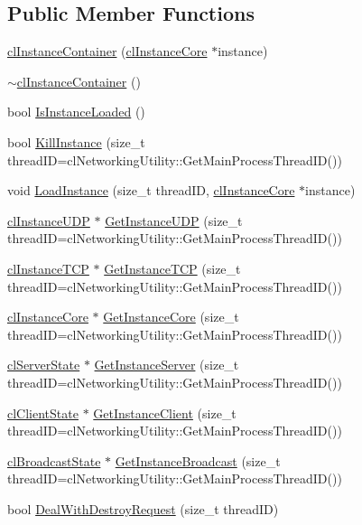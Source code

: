 \subsection*{Public Member Functions}
\begin{DoxyCompactItemize}
\item 
\hyperlink{classcl_instance_container_a49ac9b33bdb75028208c7b4084cbaacd}{clInstanceContainer} (\hyperlink{classcl_instance_core}{clInstanceCore} $\ast$instance)
\item 
\hyperlink{classcl_instance_container_a11553ac24548f650ae0500066cd10fb6}{$\sim$clInstanceContainer} ()
\item 
bool \hyperlink{classcl_instance_container_a34dad02080a638bf441c32c3b1a663b9}{IsInstanceLoaded} ()
\item 
bool \hyperlink{classcl_instance_container_abd6e085c9c842f8a5b19a9f2fec78ebe}{KillInstance} (size\_\-t threadID=clNetworkingUtility::GetMainProcessThreadID())
\item 
void \hyperlink{classcl_instance_container_a5a98fbed42ac21e30f847e35c3184101}{LoadInstance} (size\_\-t threadID, \hyperlink{classcl_instance_core}{clInstanceCore} $\ast$instance)
\item 
\hyperlink{classcl_instance_u_d_p}{clInstanceUDP} $\ast$ \hyperlink{classcl_instance_container_aa07de23793b91688b5cc19a83aa923e6}{GetInstanceUDP} (size\_\-t threadID=clNetworkingUtility::GetMainProcessThreadID())
\item 
\hyperlink{classcl_instance_t_c_p}{clInstanceTCP} $\ast$ \hyperlink{classcl_instance_container_a241894585fe9e2f910b20eea905e8825}{GetInstanceTCP} (size\_\-t threadID=clNetworkingUtility::GetMainProcessThreadID())
\item 
\hyperlink{classcl_instance_core}{clInstanceCore} $\ast$ \hyperlink{classcl_instance_container_a41722ed1f72c38de44fabe0a14a4c29c}{GetInstanceCore} (size\_\-t threadID=clNetworkingUtility::GetMainProcessThreadID())
\item 
\hyperlink{classcl_server_state}{clServerState} $\ast$ \hyperlink{classcl_instance_container_adbbe989e89a36cfbdce75a624c2e0f24}{GetInstanceServer} (size\_\-t threadID=clNetworkingUtility::GetMainProcessThreadID())
\item 
\hyperlink{classcl_client_state}{clClientState} $\ast$ \hyperlink{classcl_instance_container_a882208eec5a378ec679d1a5d00627326}{GetInstanceClient} (size\_\-t threadID=clNetworkingUtility::GetMainProcessThreadID())
\item 
\hyperlink{classcl_broadcast_state}{clBroadcastState} $\ast$ \hyperlink{classcl_instance_container_a2f2a96538fab79ca8f26954f7470f3ab}{GetInstanceBroadcast} (size\_\-t threadID=clNetworkingUtility::GetMainProcessThreadID())
\item 
bool \hyperlink{classcl_instance_container_a2cd318091c5dd6da8c31f15edbaa69d6}{DealWithDestroyRequest} (size\_\-t threadID)
\end{DoxyCompactItemize}
